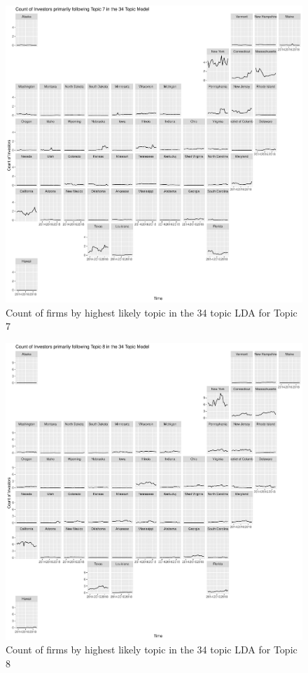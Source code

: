 		\begin{figure}
		\centering
		\includegraphics[width=1\linewidth]{Figures/ChapterV/USA_34_Topic07.pdf}
		\caption[Count of Firms for Topic 7 by Quarter]{Count of firms by highest likely topic in the 34 topic LDA for Topic 7}
		\label{fig:StateLDA7}
	\end{figure}
	
		\begin{figure}
		\centering
		\includegraphics[width=1\linewidth]{Figures/ChapterV/USA_34_Topic08.pdf}
		\caption[Count of Firms for Topic 8 by Quarter]{Count of firms by highest likely topic in the 34 topic LDA for Topic 8}
		\label{fig:StateLDA8}
	\end{figure}
	
